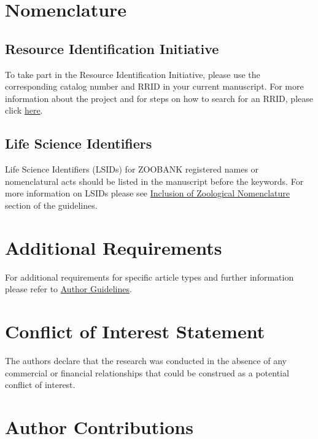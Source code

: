 \documentclass[utf8]{FrontiersinHarvard} %
\begin{document}
\section{Nomenclature}

\subsection{Resource Identification Initiative}
To take part in the Resource Identification Initiative, please use the corresponding catalog number and RRID in your current manuscript. For more information about the project and for steps on how to search for an RRID, please click \href{http://www.frontiersin.org/files/pdf/letter_to_author.pdf}{here}.

\subsection{Life Science Identifiers}
Life Science Identifiers (LSIDs) for ZOOBANK registered names or nomenclatural acts should be listed in the manuscript before the keywords. For more information on LSIDs please see \href{https://www.frontiersin.org/about/author-guidelines#Nomenclature}{Inclusion of Zoological Nomenclature} section of the guidelines.


\section{Additional Requirements}

For additional requirements for specific article types and further information please refer to \href{http://www.frontiersin.org/about/AuthorGuidelines#AdditionalRequirements}{Author Guidelines}.

\section*{Conflict of Interest Statement}

The authors declare that the research was conducted in the absence of any commercial or financial relationships that could be construed as a potential conflict of interest.

\section*{Author Contributions}
\end{document}
